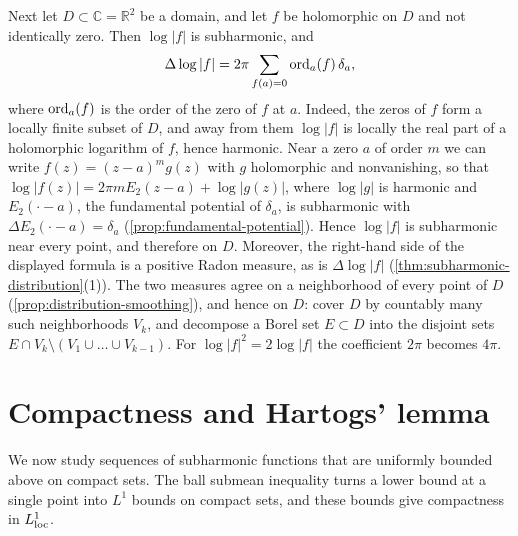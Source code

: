 \begin{example}
Next let $D\subset\mathbb C=\mathbb R^2$ be a domain, and let $f$ be holomorphic on $D$ and not identically zero. Then $\log|f|$ is subharmonic, and
\[
 \Delta\log|f|=2\pi\sum_{f(a)=0}\operatorname{ord}_a(f)\,\delta_a,
\]
where $\operatorname{ord}_a(f)$ is the order of the zero of $f$ at $a$. Indeed, the zeros of $f$ form a locally finite subset of $D$, and away from them $\log|f|$ is locally the real part of a holomorphic logarithm of $f$, hence harmonic. Near a zero $a$ of order $m$ we can write $f(z)=(z-a)^mg(z)$ with $g$ holomorphic and nonvanishing, so that $\log|f(z)|=2\pi mE_2(z-a)+\log|g(z)|$, where $\log|g|$ is harmonic and $E_2(\cdot-a)$, the fundamental potential of $\delta_a$, is subharmonic with $\Delta E_2(\cdot-a)=\delta_a$ (\cref{prop:fundamental-potential}). Hence $\log|f|$ is subharmonic near every point, and therefore on $D$. Moreover, the right-hand side of the displayed formula is a positive Radon measure, as is $\Delta\log|f|$ (\cref{thm:subharmonic-distribution}(1)). The two measures agree on a neighborhood of every point of $D$ (\cref{prop:distribution-smoothing}), and hence on $D$: cover $D$ by countably many such neighborhoods $V_k$, and decompose a Borel set $E\subset D$ into the disjoint sets $E\cap V_k\setminus(V_1\cup\dots\cup V_{k-1})$. For $\log|f|^2=2\log|f|$ the coefficient $2\pi$ becomes $4\pi$.
\end{example}

\section{Compactness and Hartogs' lemma}
\label{sec:subharmonic-compactness}
We now study sequences of subharmonic functions that are uniformly bounded above on compact sets. The ball submean inequality turns a lower bound at a single point into $L^1$ bounds on compact sets, and these bounds give compactness in $L^1_{\mathrm{loc}}$.

